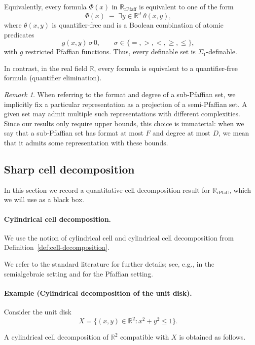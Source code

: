 \documentclass[11pt]{article}
\theoremstyle{plain}
\theoremstyle{definition}
\theoremstyle{remark}
\newtheorem{remark}[theorem]{Remark}
\newcommand{\R}{\mathbb{R}}
\newcommand{\rPfaff}{\operatorname{rPfaff}}
\begin{document}
Equivalently, every formula \(\Phi(x)\) in \(\R_{\rPfaff}\) is equivalent to
one of the form
\[
\Phi(x) \;\equiv\; \exists y \in \R^d \;\theta(x,y),
\]
where \(\theta(x,y)\) is quantifier-free and is a Boolean combination of
atomic predicates
\[
g(x,y)\,\sigma\,0,
\qquad
\sigma\in\{=,>,<,\ge,\le\},
\]
with \(g\) restricted Pfaffian functions. Thus, every definable set is
\(\Sigma_1\)-definable.

In contrast, in the real field \(\R\), every formula is equivalent to a
quantifier-free formula (quantifier elimination).

\begin{remark}
When referring to the format and degree of a sub-Pfaffian set, we implicitly
fix a particular representation as a projection of a semi-Pfaffian set.
A given set may admit multiple such representations with different
complexities. Since our results only require upper bounds, this choice is
immaterial: when we say that a sub-Pfaffian set has format at most \(F\)
and degree at most \(D\), we mean that it admits some representation with
these bounds.
\end{remark}

\subsection{Sharp cell decomposition}
\label{app:star-format-degree}

In this section we record a quantitative cell decomposition result for
\(\R_{\rPfaff}\), which we will use as a black box.


\paragraph{Cylindrical cell decomposition.}
We use the notion of cylindrical cell and cylindrical cell decomposition
from Definition~\ref{def:cell-decomposition}.

We refer to the standard literature for further details; see, e.g.,
\cite[Chapter~5]{basu2006} in the semialgebraic setting and
\cite[Definitions~5--6]{binyamini2020effective} for the Pfaffian setting.


\paragraph{Example (Cylindrical decomposition of the unit disk).}
Consider the unit disk
\[
X = \{(x,y)\in \R^2 : x^2 + y^2 \le 1\}.
\]

A cylindrical cell decomposition of $\R^2$ compatible with $X$ is obtained as follows. 
\end{document}
